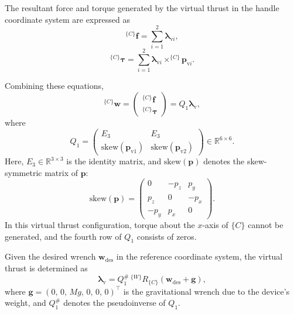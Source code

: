 \documentclass{WileyMSP-template}
\begin{document}
The resultant force and torque generated by the virtual thrust in the handle coordinate system are expressed as
\begin{equation}\label{eq:v_force_total}
  ^{\{C\}}\bm{f} = \sum_{i=1}^{2} \bm{\lambda}_{\mathrm{v}i},
\end{equation}
\begin{equation}\label{eq:v_torque_total}
  ^{\{C\}}\bm{\tau} = \sum_{i=1}^{2} \bm{\lambda}_{\mathrm{v}i} \times ^{\{C\}}\bm{p}_{\mathrm{v}i}.
\end{equation}

Combining these equations,
\begin{equation}
  ^{\{C\}}\bm{w}
  =
  \begin{pmatrix}
  ^{\{C\}}\bm{f} \\
  ^{\{C\}}\bm{\tau}
  \end{pmatrix}
  =
  Q_1 \bm{\lambda}_{\mathrm{v}},
\end{equation}
where
\begin{equation}
  Q_1 =
  \begin{pmatrix}
  E_3 & E_3 \\
  \mathrm{skew}(\bm{p}_{\mathrm{v}1}) & \mathrm{skew}(\bm{p}_{\mathrm{v}2})
  \end{pmatrix}
  \in \mathbb{R}^{6 \times 6}.
\end{equation}
Here, $E_3 \in \mathbb{R}^{3 \times 3}$ is the identity matrix, and $\mathrm{skew}(\bm{p})$ denotes the skew-symmetric matrix of $\bm{p}$:
\begin{equation}
  \mathrm{skew}(\bm{p}) =
  \begin{pmatrix}
  0 & -p_z & p_y \\
  p_z & 0 & -p_x \\
  -p_y & p_x & 0
  \end{pmatrix}.
\end{equation}
In this virtual thrust configuration, torque about the $x$-axis of $\{C\}$ cannot be generated, and the fourth row of $Q_1$ consists of zeros.

Given the desired wrench $\bm{w}_{\mathrm{des}}$ in the reference coordinate system, the virtual thrust is determined as
\begin{equation}
  \bm{\lambda}_{\mathrm{v}}
  =
  Q_1^{\#}
  \, ^{\{W\}}R_{\{C\}}
  \left(
  \bm{w}_{\mathrm{des}} + \bm{g}
  \right),
\end{equation}
where $\bm{g} = (0,\,0,\,Mg,\,0,\,0,\,0)^\top$ is the gravitational wrench due to the device’s weight, and $Q_1^{\#}$ denotes the pseudoinverse of $Q_1$.
\end{document}
